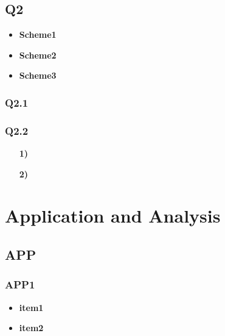 \documentclass{mcmthesis}
\begin{document}
\subsection{Q2}
\lipsum[20]
\begin{itemize}[itemsep= 0 pt,topsep = 2 pt]
  \item \textbf{Scheme1} \\

  \item \textbf{Scheme2} \\

  \item \textbf{Scheme3} \\
 
\end{itemize}
\par \lipsum[21]

\subsubsection{Q2.1}
\lipsum[22-23]

\subsubsection{Q2.2}
\lipsum[24]
\begin{itemize}
  \setlength{\itemsep}{2pt}
  \setlength{\itemsep}{0pt}
  \setlength{\itemsep}{-1pt} 
\item [\textbf{1)}] 
\lipsum[25]
\item [\textbf{2)}] 
\lipsum[26]
\end{itemize}

\section{Application and Analysis}
\subsection{APP}
\subsubsection{APP1}

\renewcommand\labelitemi{\Large$\bullet$}
\begin{itemize}[itemsep= 0 pt,topsep = 2 pt]
\item \textbf{item1} \\
\item \textbf{item2}
\end{itemize}
\end{document}
